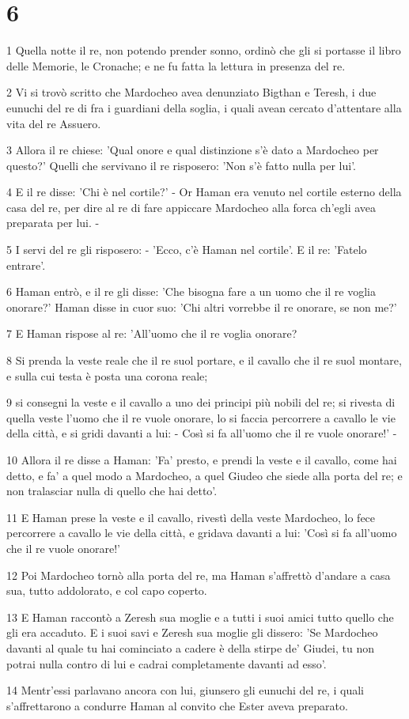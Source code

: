 \chapter{6}

\par 1 Quella notte il re, non potendo prender sonno, ordinò che gli si portasse il libro delle Memorie, le Cronache; e ne fu fatta la lettura in presenza del re.
\par 2 Vi si trovò scritto che Mardocheo avea denunziato Bigthan e Teresh, i due eunuchi del re di fra i guardiani della soglia, i quali avean cercato d'attentare alla vita del re Assuero.
\par 3 Allora il re chiese: 'Qual onore e qual distinzione s'è dato a Mardocheo per questo?' Quelli che servivano il re risposero: 'Non s'è fatto nulla per lui'.
\par 4 E il re disse: 'Chi è nel cortile?' - Or Haman era venuto nel cortile esterno della casa del re, per dire al re di fare appiccare Mardocheo alla forca ch'egli avea preparata per lui. -
\par 5 I servi del re gli risposero: - 'Ecco, c'è Haman nel cortile'. E il re: 'Fatelo entrare'.
\par 6 Haman entrò, e il re gli disse: 'Che bisogna fare a un uomo che il re voglia onorare?' Haman disse in cuor suo: 'Chi altri vorrebbe il re onorare, se non me?'
\par 7 E Haman rispose al re: 'All'uomo che il re voglia onorare?
\par 8 Si prenda la veste reale che il re suol portare, e il cavallo che il re suol montare, e sulla cui testa è posta una corona reale;
\par 9 si consegni la veste e il cavallo a uno dei principi più nobili del re; si rivesta di quella veste l'uomo che il re vuole onorare, lo si faccia percorrere a cavallo le vie della città, e si gridi davanti a lui: - Così si fa all'uomo che il re vuole onorare!' -
\par 10 Allora il re disse a Haman: 'Fa' presto, e prendi la veste e il cavallo, come hai detto, e fa' a quel modo a Mardocheo, a quel Giudeo che siede alla porta del re; e non tralasciar nulla di quello che hai detto'.
\par 11 E Haman prese la veste e il cavallo, rivestì della veste Mardocheo, lo fece percorrere a cavallo le vie della città, e gridava davanti a lui: 'Così si fa all'uomo che il re vuole onorare!'
\par 12 Poi Mardocheo tornò alla porta del re, ma Haman s'affrettò d'andare a casa sua, tutto addolorato, e col capo coperto.
\par 13 E Haman raccontò a Zeresh sua moglie e a tutti i suoi amici tutto quello che gli era accaduto. E i suoi savi e Zeresh sua moglie gli dissero: 'Se Mardocheo davanti al quale tu hai cominciato a cadere è della stirpe de' Giudei, tu non potrai nulla contro di lui e cadrai completamente davanti ad esso'.
\par 14 Mentr'essi parlavano ancora con lui, giunsero gli eunuchi del re, i quali s'affrettarono a condurre Haman al convito che Ester aveva preparato.

